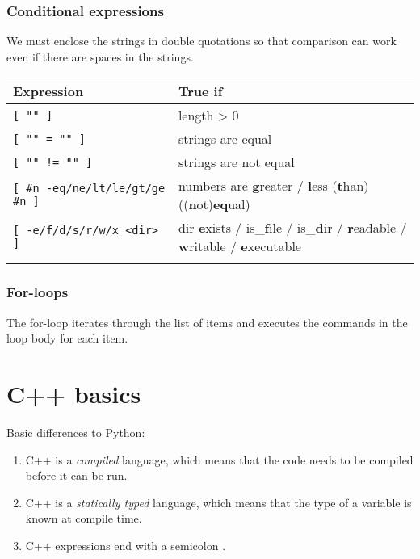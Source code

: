 \documentclass{article}
\begin{document}
\subsubsection{Conditional expressions}
We must enclose the strings in double quotations so that comparison can work even if there are spaces in the strings.
\begin{table}[H]
    \begin{tabular}{ll}
        \textbf{Expression}                      & \textbf{True if}                                                                                       \\ \hline
        \lstinline|[ "" ]|                       & length > 0                                                                                             \\ \arrayrulecolor{lightgray}\hline
        \lstinline|[ "" = "" ]|                  & strings are equal                                                                                      \\ \arrayrulecolor{lightgray}\hline
        \lstinline|[ "" != "" ]|                 & strings are not equal                                                                                  \\ \arrayrulecolor{lightgray}\hline
        \lstinline|[ #n -eq/ne/lt/le/gt/ge #n ]| & numbers are {\bf g}reater / {\bf l}ess ({\bf t}han) (({\bf n}ot){\bf eq}ual)                           \\ \arrayrulecolor{lightgray}\hline
        \lstinline|[ -e/f/d/s/r/w/x <dir> ]|     & dir {\bf e}xists / is\_{\bf f}ile / is\_{\bf d}ir / {\bf r}eadable / {\bf w}ritable / {\bf e}xecutable \\ \arrayrulecolor{lightgray}\hline
    \end{tabular}
\end{table}

\subsubsection{For-loops}
The for-loop iterates through the list of items and executes the commands in the loop body for each item.



\section{C++ basics}
Basic differences to Python:
\begin{enumerate}
    \item C++ is a \emph{compiled} language, which means that the code needs to be compiled before it can be run.
    \item C++ is a \emph{statically typed} language, which means that the type of a variable is known at compile time.
    \item C++ expressions end with a semicolon .
\end{enumerate}
\end{document}
